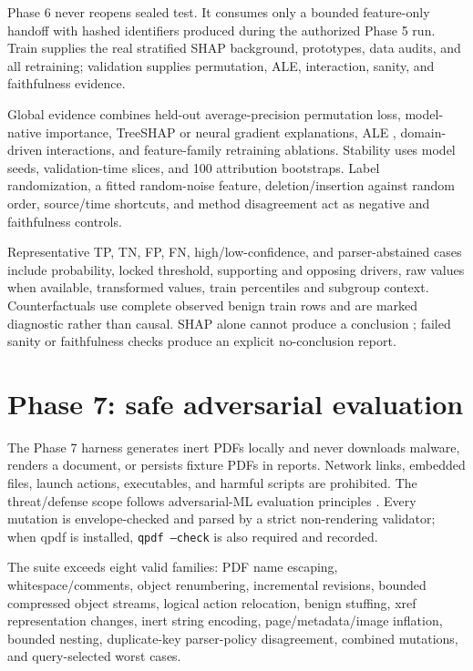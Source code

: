 \documentclass[11pt,a4paper]{article}
\begin{document}
Phase 6 never reopens sealed test. It consumes only a bounded feature-only
handoff with hashed identifiers produced during the authorized Phase 5 run.
Train supplies the real stratified SHAP background, prototypes, data audits, and
all retraining; validation supplies permutation, ALE, interaction, sanity, and
faithfulness evidence.

Global evidence combines held-out average-precision permutation loss,
model-native importance, TreeSHAP or neural gradient explanations, ALE \cite{ale},
domain-driven interactions, and feature-family retraining ablations. Stability
uses model seeds, validation-time slices, and 100 attribution bootstraps. Label randomization, a fitted random-noise
feature, deletion/insertion against random order, source/time shortcuts, and
method disagreement act as negative and faithfulness controls.

Representative TP, TN, FP, FN, high/low-confidence, and parser-abstained cases
include probability, locked threshold, supporting and opposing drivers, raw
values when available, transformed values, train percentiles and subgroup
context. Counterfactuals use complete observed benign train rows and are marked
diagnostic rather than causal. SHAP alone cannot produce a conclusion \cite{shap}; failed
sanity or faithfulness checks produce an explicit no-conclusion report.

\section{Phase 7: safe adversarial evaluation}

The Phase 7 harness generates inert PDFs locally and never downloads malware,
renders a document, or persists fixture PDFs in reports. Network links, embedded
files, launch actions, executables, and harmful scripts are prohibited. The
threat/defense scope follows adversarial-ML evaluation principles
\cite{biggio_adversarial}. Every
mutation is envelope-checked and parsed by a strict non-rendering validator;
when qpdf is installed, \texttt{qpdf --check} is also required and recorded.

The suite exceeds eight valid families: PDF name escaping, whitespace/comments,
object renumbering, incremental revisions, bounded compressed object streams,
logical action relocation, benign stuffing, xref representation changes, inert
string encoding, page/metadata/image inflation, bounded nesting, duplicate-key
parser-policy disagreement, combined mutations, and query-selected worst cases.
\end{document}
